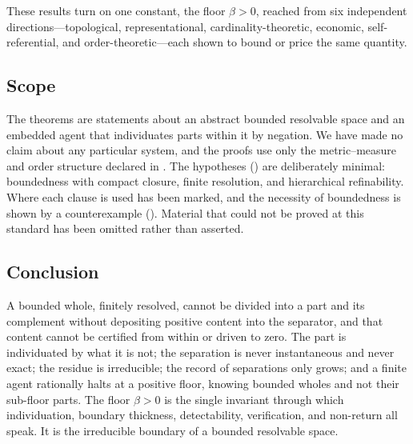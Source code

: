 \documentclass[11pt,a4paper]{article}
\theoremstyle{thmstyle}
\theoremstyle{definition}
\theoremstyle{remark}
\newcommand{\thick}{\beta}
\begin{document}
These results turn on one constant, the floor $\thick>0$, reached from six
independent directions---topological, representational, cardinality-theoretic,
economic, self-referential, and order-theoretic---each shown to bound or price
the same quantity.

\subsection{Scope}

The theorems are statements about an abstract bounded resolvable space and an
embedded agent that individuates parts within it by negation. We have made no
claim about any particular system, and the proofs use only the metric--measure
and order structure declared in . The hypotheses
() are deliberately minimal: boundedness with compact closure,
finite resolution, and hierarchical refinability. Where each clause is used has
been marked, and the necessity of boundedness is shown by a counterexample
(). Material that could not be proved at this standard
has been omitted rather than asserted.

\subsection{Conclusion}

A bounded whole, finitely resolved, cannot be divided into a part and its
complement without depositing positive content into the separator, and that
content cannot be certified from within or driven to zero. The part is
individuated by what it is not; the separation is never instantaneous and never
exact; the residue is irreducible; the record of separations only grows; and a
finite agent rationally halts at a positive floor, knowing bounded wholes and not
their sub-floor parts. The floor $\thick>0$ is the single invariant through which
individuation, boundary thickness, detectability, verification, and non-return
all speak. It is the irreducible boundary of a bounded resolvable space.



\end{document}
